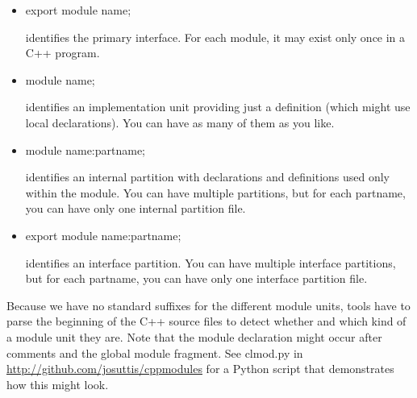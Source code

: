\begin{itemize}
\item 
export module name; 

identifies the primary interface. For each module, it may exist only once in a C++ program.

\item 
module name; 

identifies an implementation unit providing just a definition (which might use local declarations). You can have as many of them as you like.

\item 
module name:partname; 

identifies an internal partition with declarations and definitions used only within the module. You can have multiple partitions, but for each partname, you can have only one internal partition file.

\item 
export module name:partname; 

identifies an interface partition. You can have multiple interface partitions, but for each partname, you can have only one interface partition file.
\end{itemize}

Because we have no standard suffixes for the different module units, tools have to parse the beginning of the C++ source files to detect whether and which kind of a module unit they are. Note that the module declaration might occur after comments and the global module fragment. See clmod.py in \url{http://github.com/josuttis/cppmodules} for a Python script that demonstrates how this might look.






